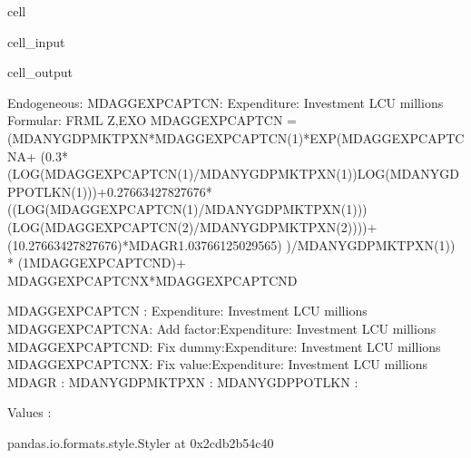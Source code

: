 \documentclass[letterpaper,10pt,english]{jupyterBook}
\begin{document}
\begin{sphinxuseclass}{cell}\begin{sphinxVerbatimInput}

\begin{sphinxuseclass}{cell_input}
\begin{sphinxVerbatim}[commandchars=\\\{\}]
 
\end{sphinxVerbatim}

\end{sphinxuseclass}\end{sphinxVerbatimInput}
\begin{sphinxVerbatimOutput}

\begin{sphinxuseclass}{cell_output}
\begin{sphinxVerbatim}[commandchars=\\\{\}]
Endogeneous: MDAGGEXPCAPTCN: Expenditure: Investment LCU millions
Formular: FRML \PYGZlt{}Z,EXO\PYGZgt{} MDAGGEXPCAPTCN = (MDANYGDPMKTPXN*MDAGGEXPCAPTCN(\PYGZhy{}1)*EXP(MDAGGEXPCAPTCN\PYGZus{}A+ (\PYGZhy{}0.3*(LOG(MDAGGEXPCAPTCN(\PYGZhy{}1)/MDANYGDPMKTPXN(\PYGZhy{}1))\PYGZhy{}LOG(MDANYGDPPOTLKN(\PYGZhy{}1)))+0.27663427827676*((LOG(MDAGGEXPCAPTCN(\PYGZhy{}1)/MDANYGDPMKTPXN(\PYGZhy{}1)))\PYGZhy{}(LOG(MDAGGEXPCAPTCN(\PYGZhy{}2)/MDANYGDPMKTPXN(\PYGZhy{}2))))+(1\PYGZhy{}0.27663427827676)*MDAGR\PYGZhy{}1.03766125029565) )/MDANYGDPMKTPXN(\PYGZhy{}1)) * (1\PYGZhy{}MDAGGEXPCAPTCN\PYGZus{}D)+ MDAGGEXPCAPTCN\PYGZus{}X*MDAGGEXPCAPTCN\PYGZus{}D  \PYGZdl{}

MDAGGEXPCAPTCN  : Expenditure: Investment LCU millions
MDAGGEXPCAPTCN\PYGZus{}A: Add factor:Expenditure: Investment LCU millions
MDAGGEXPCAPTCN\PYGZus{}D: Fix dummy:Expenditure: Investment LCU millions
MDAGGEXPCAPTCN\PYGZus{}X: Fix value:Expenditure: Investment LCU millions
MDAGR           : 
MDANYGDPMKTPXN  : 
MDANYGDPPOTLKN  : 

Values :
\end{sphinxVerbatim}

\begin{sphinxVerbatim}[commandchars=\\\{\}]
\PYGZlt{}pandas.io.formats.style.Styler at 0x2cdb2b54c40\PYGZgt{}
\end{sphinxVerbatim}


\end{sphinxuseclass}
\end{sphinxVerbatimOutput}
\end{sphinxuseclass}
\end{document}
